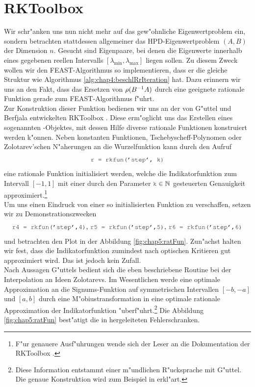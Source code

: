\section{RKToolbox}

Wir schr"anken uns nun nicht mehr auf das gew"ohnliche Eigenwertproblem ein, sondern betrachten stattdessen allgemeiner das HPD-Eigenwertproblem $(A,B)$ der Dimension $n$. Gesucht sind Eigenpaare, bei denen die Eigenwerte innerhalb eines gegebenen reellen Intervalls $[\lambda_{\min}, \lambda_{\max}]$ liegen sollen.
Zu diesem Zweck wollen wir den FEAST-Algorithmus so implementieren, dass er die gleiche Struktur wie Algorithmus \ref{alg:chap4:beschlRrIteration} hat. Dazu erinnern wir uns an den Fakt, dass das Ersetzen von $\rho(B^{-1}A)$ durch eine geeignete rationale Funktion gerade zum FEAST-Algorithmus f"uhrt.\\

Zur Konstruktion dieser Funktion bedienen wir uns an der von G"uttel und Berfjala entwickelten RKToolbox \cite{rkt}. Diese erm"oglicht uns das Erstellen eines sogenannten -Objektes, mit dessen Hilfe diverse rationale Funktionen konstruiert werden k"onnen. Neben konstanten Funktionen, Tschebyscheff-Polynomen oder Zolotarev'schen N"aherungen an die Wurzelfunktion kann durch den Aufruf
\[
\mcode{r = rkfun('step', k)}
\]
eine rationale Funktion  initialisiert werden, welche die Indikatorfunktion zum Intervall $[-1,1]$ mit einer durch den Parameter $\mcode{k}\in\N$ gesteuerten Genauigkeit approximiert.\footnote{F"ur genauere Ausf"uhrungen wende sich der Leser an die Dokumentation der RKToolbox \cite{rkt}.}\\

Um uns einen Eindruck von einer so initialisierten Funktion zu verschaffen, setzen wir zu Demonstrationszwecken
\[
\mcode{r4 = rkfun('step',4)}\text{,  }\mcode{r5 = rkfun('step',5)}\text{,  }
\mcode{r6 = rkfun('step',6)}
\]
und betrachten den Plot in der Abbildung \ref{fig:chap5:ratFun}. Zun"achst halten wir fest, dass die Indikatorfunktion zumindest nach optischen Kritieren gut approximiert wird. Das ist jedoch kein Zufall.\\

Nach Aussagen G"uttels bedient sich die eben beschriebene Routine bei der Interpolation an Ideen Zolotarevs. Im Wesentlichen werde eine optimale Approximation an die Signums-Funktion auf symmetrischen Intervallen $[-b,-a]$ und $[a,b]$ durch eine M"obiustransformation in eine optimale rationale Approximation der Indikatorfunktion "uberf"uhrt.\footnote{Diese Information entstammt einer m"undlichen R"ucksprache mit G"uttel. Die genaue Konstruktion wird zum Beispiel in \cite[Abschnitt 4]{zol} erkl"art.} Die Abbildung \ref{fig:chap5:ratFun} best"atigt die in \cite[Abschnitt 4]{zol} hergeleiteten Fehlerschranken.

